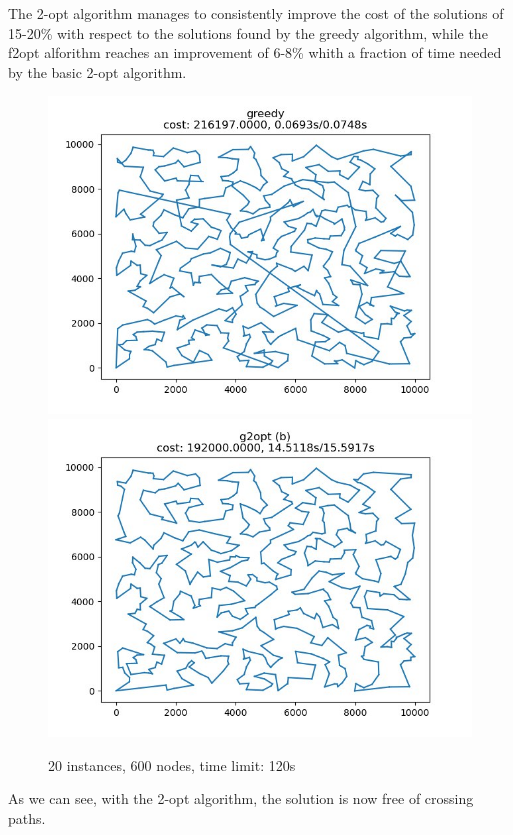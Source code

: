 The 2-opt algorithm manages to consistently improve the cost of the solutions of 15-20\% with respect to the solutions found by the greedy algorithm, while the f2opt alforithm reaches an improvement of 6-8\% whith a fraction of time needed by the basic 2-opt algorithm.

\begin{figure}[h]
    \centering
    \includegraphics*[width=.45\textwidth]{../solutions/1_600_greedy.jpg}
    \includegraphics*[width=.45\textwidth]{../solutions/1_600_g2opt.jpg}
    \caption*{20 instances, 600 nodes, time limit: 120s}
\end{figure}

As we can see, with the 2-opt algorithm, the solution is now free of crossing paths.